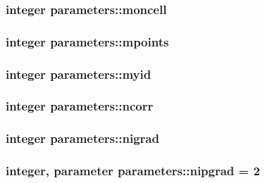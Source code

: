 \hypertarget{classparameters_a56007b199efcf9e04f4073797fa63053}{
\subsubsection[{moncell}]{\setlength{\rightskip}{0pt plus 5cm}integer parameters\-::moncell}}\label{classparameters_a56007b199efcf9e04f4073797fa63053}
\hypertarget{classparameters_a5957a9f734a0f3f197192418d8df0cf2}{
\subsubsection[{mpoints}]{\setlength{\rightskip}{0pt plus 5cm}integer parameters\-::mpoints}}\label{classparameters_a5957a9f734a0f3f197192418d8df0cf2}
\hypertarget{classparameters_aeaa510845dde7f4dc7f917a4ad50869d}{
\subsubsection[{myid}]{\setlength{\rightskip}{0pt plus 5cm}integer parameters\-::myid}}\label{classparameters_aeaa510845dde7f4dc7f917a4ad50869d}
\hypertarget{classparameters_a29b4860883a45d946a351cf857d64777}{
\subsubsection[{ncorr}]{\setlength{\rightskip}{0pt plus 5cm}integer parameters\-::ncorr}}\label{classparameters_a29b4860883a45d946a351cf857d64777}
\hypertarget{classparameters_aa91db57a797a6ddebc34cd969fe8c762}{
\subsubsection[{nigrad}]{\setlength{\rightskip}{0pt plus 5cm}integer parameters\-::nigrad}}\label{classparameters_aa91db57a797a6ddebc34cd969fe8c762}
\hypertarget{classparameters_a65960673b4dcafc001e47eb1a31eac13}{
\subsubsection[{nipgrad}]{\setlength{\rightskip}{0pt plus 5cm}integer, parameter parameters\-::nipgrad = 2}}\label{classparameters_a65960673b4dcafc001e47eb1a31eac13}
